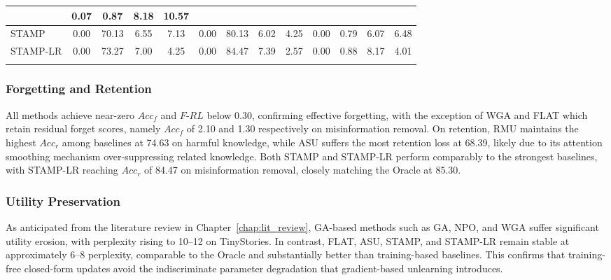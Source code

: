 \begin{table}[htbp]
\begin{adjustbox}{max width=\textwidth}
\begin{tabular}{p{1.7cm}|cccc|cccc|cccc}
  & \colorbox{yellow!40}{0.07} & \colorbox{yellow!40}{0.87} & 8.18 & 10.57 \\
\midrule\midrule
STAMP
  & 0.00 & 70.13 & \colorbox{yellow!40}{6.55} & \colorbox{yellow!40}{7.13}
  & 0.00 & 80.13 & \colorbox{green!30}{6.02} & 4.25
  & \colorbox{green!30}{0.00} & 0.79 & \colorbox{green!30}{6.07} & \colorbox{yellow!40}{6.48} \\
STAMP-LR
  & 0.00 & \colorbox{green!30}{73.27} & \colorbox{green!30}{7.00} & \colorbox{green!30}{4.25}
  & 0.00 & \colorbox{green!30}{84.47} & \colorbox{yellow!40}{7.39} & \colorbox{green!30}{2.57}
  & \colorbox{green!30}{0.00} & \colorbox{green!30}{0.88} & 8.17 & \colorbox{green!30}{4.01} \\
\Xhline{1.15pt}
\end{tabular}
\end{adjustbox}
\end{table}

\subsubsection{Forgetting and Retention}

All methods achieve near-zero $Acc_f$ and $F$-$RL$ below 0.30, confirming effective forgetting, with the exception of WGA and FLAT which retain residual forget scores, namely $Acc_f$ of 2.10 and 1.30 respectively on misinformation removal. On retention, RMU maintains the highest $Acc_r$ among baselines at 74.63 on harmful knowledge, while ASU suffers the most retention loss at 68.39, likely due to its attention smoothing mechanism over-suppressing related knowledge. Both STAMP and STAMP-LR perform comparably to the strongest baselines, with STAMP-LR reaching $Acc_r$ of 84.47 on misinformation removal, closely matching the Oracle at 85.30.


\subsubsection{Utility Preservation}

As anticipated from the literature review in Chapter~\ref{chap:lit_review}, GA-based methods such as GA, NPO, and WGA suffer significant utility erosion, with perplexity rising to 10--12 on TinyStories. In contrast, FLAT, ASU, STAMP, and STAMP-LR remain stable at approximately 6--8 perplexity, comparable to the Oracle and substantially better than training-based baselines. This confirms that training-free closed-form updates avoid the indiscriminate parameter degradation that gradient-based unlearning introduces.

